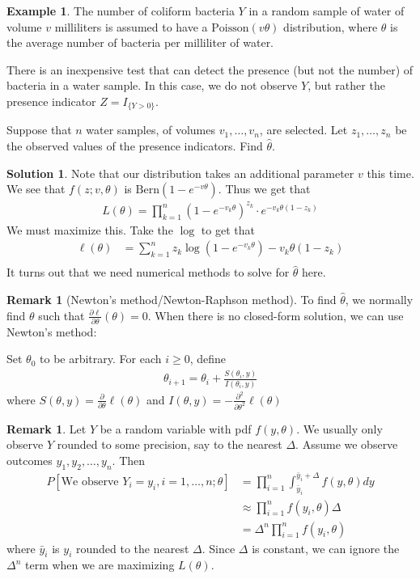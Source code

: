 \documentclass[11pt]{amsart}
\theoremstyle{definition}
\newtheorem{remark}[theorem]{Remark}
\newtheorem{example}[theorem]{Example}
\newtheorem{solution}[theorem]{Solution}
\numberwithin{equation}{section}
\begin{document}
\begin{example}
    The number of coliform bacteria $Y$ in a random sample of water of volume $v$ milliliters is assumed to have a $\mathrm{Poisson}(v\theta)$ distribution, where $\theta$ is the average number of bacteria per milliliter of water.

    There is an inexpensive test that can detect the presence (but not the number) of bacteria in a water sample. In this case, we do not observe $Y$, but rather the presence indicator $Z=I_{\{Y>0\}}$.

    Suppose that $n$ water samples, of volumes $v_1,\ldots,v_n$, are selected. Let $z_1,\ldots,z_n$ be the observed values of the presence indicators. Find $\hat\theta$.
\end{example}
\addtocounter{theorem}{-1}
\begin{solution}
    Note that our distribution takes an additional parameter $v$ this time. We see that $f(z;v,\theta)$ is $\mathrm{Bern}(1-e^{-v\theta})$. Thus we get that
    \begin{align*}
        L(\theta)=\prod_{k=1}^n(1-e^{-v_k\theta})^{z_k}\cdot e^{-v_k\theta (1-z_k)}
    \end{align*}
    We must maximize this. Take the $\log$ to get that
    \begin{align*}
        \ell(\theta)&=\sum_{k=1}^nz_k\log(1-e^{-v_k\theta})-v_k\theta(1-z_k)\\
    \end{align*}
    It turns out that we need numerical methods to solve for $\hat\theta$ here.
\end{solution}
\begin{remark}[Newton's method/Newton-Raphson method]
    To find $\hat\theta$, we normally find $\theta$ such that $\frac{\partial \ell}{\partial\theta}(\theta)=0$. When there is no closed-form solution, we can use Newton's method:

    Set $\theta_0$ to be arbitrary. For each $i\ge 0$, define
    \begin{align*}
        \theta_{i+1}=\theta_i+\frac{S(\theta_i,y)}{I(\theta_i,y)}
    \end{align*}
    where $S(\theta,y)=\frac{\partial}{\partial \theta}\ell(\theta)$ and $I(\theta,y)=-\frac{\partial^2}{\partial\theta^2}\ell(\theta)$
\end{remark}
\begin{remark}
    Let $Y$ be a random variable with pdf $f(y,\theta)$. We usually only observe $Y$ rounded to some precision, say to the nearest $\Delta$. Assume we observe outcomes $y_1,y_2,\ldots,y_n$. Then
    \begin{align*}
        P[\text{We observe }Y_i=y_i,i=1,\ldots,n;\theta]&=\prod_{i=1}^n\int_{\bar y_i}^{\bar y_i+\Delta}f(y,\theta)dy\\
        &\approx\prod_{i=1}^nf(y_i,\theta)\Delta\\
        &=\Delta^n\prod_{i=1}^nf(y_i,\theta)
    \end{align*}
    where $\bar y_i$ is $y_i $ rounded to the nearest $\Delta$. Since $\Delta$ is constant, we can ignore the $\Delta^n$ term when we are maximizing $L(\theta)$.
\end{remark}
\end{document}
